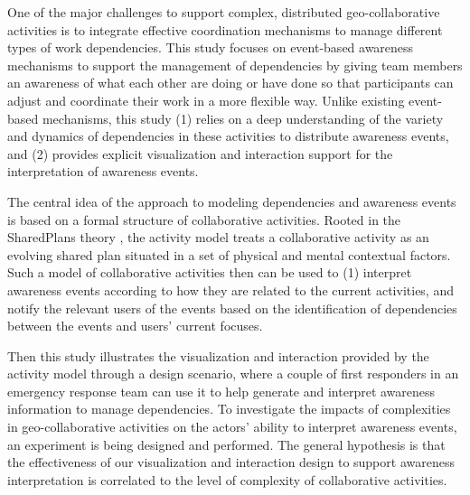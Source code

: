 One of the major challenges to support complex, distributed geo-collaborative activities is to integrate effective coordination mechanisms to manage different types of work dependencies. This study focuses on event-based awareness mechanisms to support the management of dependencies by giving team members an awareness of what each other are doing or have done so that participants can adjust and coordinate their work in a more flexible way. Unlike existing event-based mechanisms, this study (1) relies on a deep understanding of the variety and dynamics of dependencies in these activities to distribute awareness events, and (2) provides explicit visualization and interaction support for the interpretation of awareness events.  

The central idea of the approach to modeling dependencies and awareness events is based on a formal structure of collaborative activities. Rooted in the SharedPlans theory \cite{grosz1996collaborative}, the activity model treats a collaborative activity as an evolving shared plan situated in a set of physical and mental contextual factors. Such a model of collaborative activities then can be used to (1) interpret awareness events according to how they are related to the current activities, and notify the relevant users of the events based on the identification of dependencies between the events and users' current focuses. 

Then this study illustrates the visualization and interaction provided by the activity model through a design scenario, where a couple of first responders in an emergency response team can use it to help generate and interpret awareness information to manage dependencies. To investigate the impacts of complexities in geo-collaborative activities on the actors' ability to interpret awareness events, an experiment is being designed and performed. The general hypothesis is that the effectiveness of our visualization and interaction design to support awareness interpretation is correlated to the level of complexity of collaborative activities.
